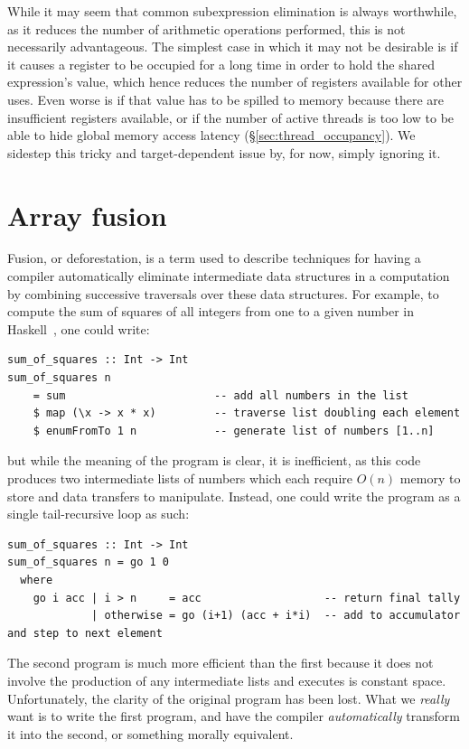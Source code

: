 While it may seem that common subexpression elimination is always worthwhile, as
it reduces the number of arithmetic operations performed, this is not
necessarily advantageous. The simplest case in which it may not be desirable is
if it causes a register to be occupied for a long time in order to hold the
shared expression's value, which hence reduces the number of registers available
for other uses. Even worse is if that value has to be spilled to memory because
there are insufficient registers available, or if the number of active threads
is too low to be able to hide global memory access latency
(\S\ref{sec:thread_occupancy}). We sidestep this tricky and target-dependent
issue by, for now, simply ignoring it.


\section{Array fusion}
\label{sec:array_fusion}

Fusion, or deforestation, is a term used to describe techniques for having a
compiler automatically eliminate intermediate data structures in a computation
by combining successive traversals over these data structures. For example, to
compute the sum of squares of all integers from one to a given number in
Haskell~\cite{Haskell:1998}, one could write:
%
\begin{lstlisting}[style=haskell]
sum_of_squares :: Int -> Int
sum_of_squares n
    = sum                       -- add all numbers in the list
    $ map (\x -> x * x)         -- traverse list doubling each element
    $ enumFromTo 1 n            -- generate list of numbers [1..n]
\end{lstlisting}
%
but while the meaning of the program is clear, it is inefficient, as this code
produces two intermediate lists of numbers which each require $O(n)$ memory to
store and data transfers to manipulate. Instead, one could write the program
as a single tail-recursive loop as such:
%
\begin{lstlisting}[style=haskell]
sum_of_squares :: Int -> Int
sum_of_squares n = go 1 0
  where
    go i acc | i > n     = acc                   -- return final tally
             | otherwise = go (i+1) (acc + i*i)  -- add to accumulator and step to next element
\end{lstlisting}
%
The second program is much more efficient than the first because it does not
involve the production of any intermediate lists and executes is constant space.
Unfortunately, the clarity of the original program has been lost. What we
\emph{really} want is to write the first program, and have the compiler
\emph{automatically} transform it into the second, or something morally
equivalent.


